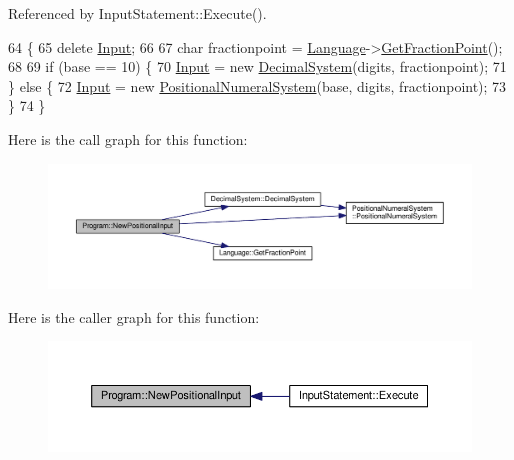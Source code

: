 Referenced by Input\+Statement\+::\+Execute().


\begin{DoxyCode}
64 \{
65     \textcolor{keyword}{delete} \hyperlink{classProgram_a6327f15962926e4f74f15e8ff56e04e5}{Input};
66 
67     \textcolor{keywordtype}{char} fractionpoint = \hyperlink{classLanguage}{Language}->\hyperlink{classLanguage_a4c214f08d47e84d53f37bcb5b1fe1b65}{GetFractionPoint}();
68 
69     \textcolor{keywordflow}{if} (base == 10) \{
70         \hyperlink{classProgram_a6327f15962926e4f74f15e8ff56e04e5}{Input} = \textcolor{keyword}{new} \hyperlink{classDecimalSystem}{DecimalSystem}(digits, fractionpoint);
71     \} \textcolor{keywordflow}{else} \{
72         \hyperlink{classProgram_a6327f15962926e4f74f15e8ff56e04e5}{Input} = \textcolor{keyword}{new} \hyperlink{classPositionalNumeralSystem}{PositionalNumeralSystem}(base, digits, fractionpoint);
73     \}
74 \}
\end{DoxyCode}


Here is the call graph for this function\+:
\nopagebreak
\begin{figure}[H]
\begin{center}
\leavevmode
\includegraphics[width=350pt]{dc/db5/classProgram_aef8e1c957776e550081cb2c47a11d64b_cgraph}
\end{center}
\end{figure}




Here is the caller graph for this function\+:
\nopagebreak
\begin{figure}[H]
\begin{center}
\leavevmode
\includegraphics[width=350pt]{dc/db5/classProgram_aef8e1c957776e550081cb2c47a11d64b_icgraph}
\end{center}
\end{figure}


